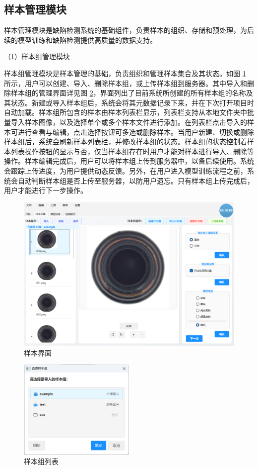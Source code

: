 \documentclass[
  ]{njuthesis}
\begin{document}
\subsection{样本管理模块}

样本管理模块是缺陷检测系统的基础组件，负责样本的组织、存储和预处理，为后续的模型训练和缺陷检测提供高质量的数据支持。

（1）样本组管理模块

样本组管理模块是样本管理的基础，负责组织和管理样本集合及其状态。如图 \ref{样本界面} 所示，用户可以创建、导入、删除样本组，或上传样本组到服务器。其中导入和删除样本组的管理界面详见图 \ref{样本组列表}，界面列出了目前系统所创建的所有样本组的名称及其状态。新建或导入样本组后，系统会将其元数据记录下来，并在下次打开项目时自动加载。样本组所包含的样本由样本列表栏显示，列表栏支持从本地文件夹中批量导入样本图像，以及选择单个或多个样本文件进行添加。在列表栏点击导入的样本可进行查看与编辑，点击选择按钮可多选或删除样本。当用户新建、切换或删除样本组后，系统会刷新样本列表栏，并修改样本组的状态。样本组的状态控制着样本列表操作按钮的显示与否，仅当样本组存在时用户才能对样本进行导入、删除等操作。样本编辑完成后，用户可以将样本组上传到服务器中，以备后续使用。系统会跟踪上传进度，为用户提供动态反馈。另外，在用户进入模型训练流程之前，系统会自动判断样本组是否上传至服务器，以防用户遗忘。只有样本组上传完成后，用户才能进行下一步操作。

\begin{figure}[htb]
    \centering
    \includegraphics[width=\textwidth]{images/样本界面.png}
    \caption{样本界面}
    \label{样本界面}
\end{figure}

\begin{figure}[htb]
    \centering
    \includegraphics[width=0.5\textwidth]{images/样本组列表.png}
    \caption{样本组列表}
    \label{样本组列表}
\end{figure}
\end{document}
